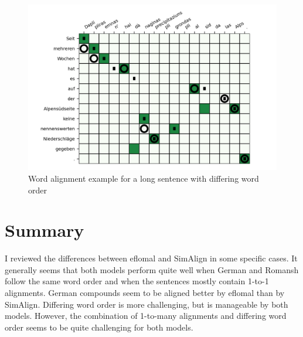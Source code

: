 \begin{figure}
	\includegraphics{graphics/alignments/195.png}
	\caption{Word alignment example for a long sentence with differing word order}
	\label{fig:195-seit-mehreren}
\end{figure}

\section{Summary}
I reviewed the differences between eflomal and SimAlign in some specific cases. 
It generally seems that both models perform quite well when German and Romansh follow the same word order and when the sentences mostly contain 1-to-1 alignments. 
German compounds seem to be aligned better by eflomal than by SimAlign. 
Differing word order is more challenging, but is manageable by both models. 
However, the combination of 1-to-many alignments and differing word order seems to be quite challenging for both models.
